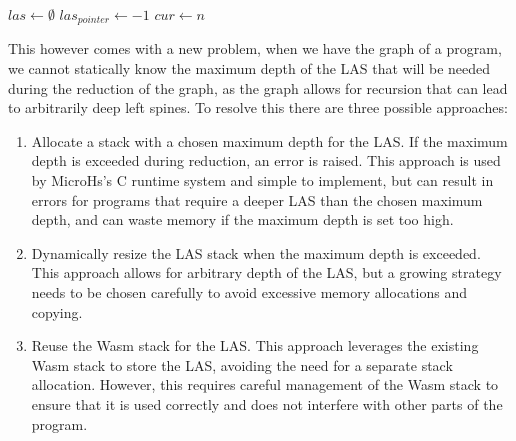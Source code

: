 \begin{algorithm}
\caption{SK Reduction with maintained LAS}
\label{alg:sk_reduction}
$las \gets \emptyset$\;
$las_{pointer} \gets -1$\;
$cur \gets n$\;
\end{algorithm}

This however comes with a new problem, when we have the graph of a program, we cannot statically know the maximum depth of the LAS that will be needed during the reduction of the graph, as the graph allows for recursion that can lead to arbitrarily deep left spines. To resolve this there are three possible approaches:
\begin{enumerate}
    \item Allocate a stack with a chosen maximum depth for the LAS. If the maximum depth is exceeded during reduction, an error is raised. This approach is used by MicroHs's C runtime system and simple to implement, but can result in errors for programs that require a deeper LAS than the chosen maximum depth, and can waste memory if the maximum depth is set too high.
    \item Dynamically resize the LAS stack when the maximum depth is exceeded. This approach allows for arbitrary depth of the LAS, but a growing strategy needs to be chosen carefully to avoid excessive memory allocations and copying.
    \item Reuse the Wasm stack for the LAS. This approach leverages the existing Wasm stack to store the LAS, avoiding the need for a separate stack allocation. However, this requires careful management of the Wasm stack to ensure that it is used correctly and does not interfere with other parts of the program.
\end{enumerate}

